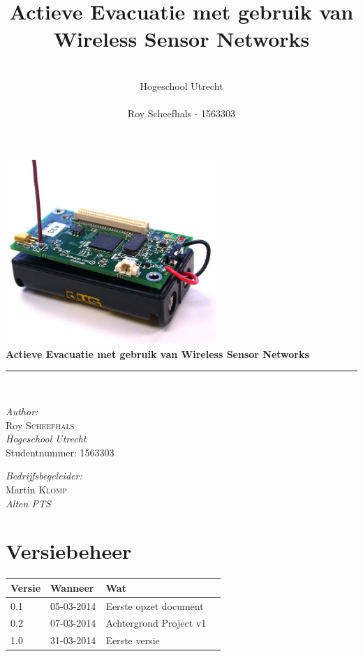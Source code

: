 \documentclass{../local}
\title{\textbf{Actieve Evacuatie met gebruik van Wireless Sensor Networks}}
\author{\\
		Hogeschool Utrecht\\
		\\
		Roy Scheefhals - 1563303}
\begin{document}
\begin{titlepage}
\begin{center}

\includegraphics[width=0.6\textwidth]{mica2}~\\[1cm]

{ \huge \bfseries Actieve Evacuatie met gebruik van Wireless Sensor Networks \\[0.4cm] }
\hrule
\hspace{0pt} \\[1.3cm]

\begin{minipage}{0.4\textwidth}
\begin{flushleft} \large
\emph{Author:}\\
Roy \textsc{Scheefhals}\\
\emph{Hogeschool Utrecht}\\
Studentnummer: 1563303\\
\end{flushleft}
\end{minipage}
\begin{minipage}{0.4\textwidth}
\begin{flushright} \large
\emph{Bedrijfsbegeleider:} \\
Martin \textsc{Klomp}\\
\emph{Alten PTS}
\end{flushright}
\end{minipage}

\end{center}
\end{titlepage}

\thispagestyle{empty}
\renewcommand{\thesection}{\Roman{section}}

\section*{Versiebeheer}
\begin{tabular}{ | l | l | l | p{7.5cm} |}
\hline
Versie & Wanneer & Wat \\ \hline
0.1 & 05-03-2014 & Eerste opzet document\\ \hline
0.2 & 07-03-2014 & Achtergrond Project v1\\ \hline
1.0 & 31-03-2014 & Eerste versie\\ \hline

\end{tabular}
\end{document}
